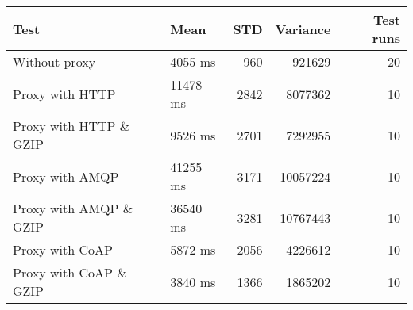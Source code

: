 \begin{tabularx}{\textwidth}{llrrr}
\hline
 Test                   & Mean     &   STD &   Variance &   Test runs \\
\hline
 Without proxy          & 4055 ms  &   960 &     921629 &          20 \\
 Proxy with HTTP        & 11478 ms &  2842 &    8077362 &          10 \\
 Proxy with HTTP \& GZIP & 9526 ms  &  2701 &    7292955 &          10 \\
 Proxy with AMQP        & 41255 ms &  3171 &   10057224 &          10 \\
 Proxy with AMQP \& GZIP & 36540 ms &  3281 &   10767443 &          10 \\
 Proxy with CoAP        & 5872 ms  &  2056 &    4226612 &          10 \\
 Proxy with CoAP \& GZIP & 3840 ms  &  1366 &    1865202 &          10 \\
\hline
\end{tabularx}